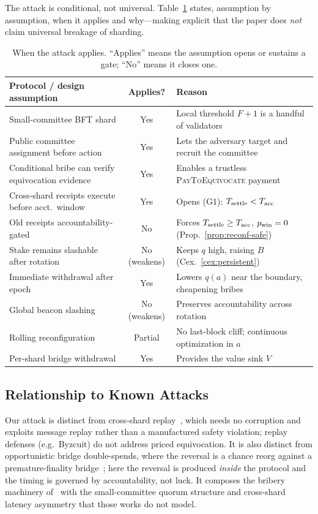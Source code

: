 The attack is conditional, not universal. Table~\ref{tab:applicability} states, assumption by
assumption, when it applies and why---making explicit that the paper does \emph{not} claim universal
breakage of sharding.

\begin{table}[t]
\centering
\caption{When the attack applies. ``Applies'' means the assumption opens or sustains a gate; ``No''
means it closes one.}
\label{tab:applicability}
\small
\begin{tabularx}{\textwidth}{@{}lcX@{}}
\toprule
Protocol / design assumption & Applies? & Reason \\
\midrule
Small-committee BFT shard                          & Yes        & Local threshold $F{+}1$ is a handful of validators \\
Public committee assignment before action          & Yes        & Lets the adversary target and recruit the committee \\
Conditional bribe can verify equivocation evidence & Yes        & Enables a trustless \textsc{PayToEquivocate} payment \\
Cross-shard receipts execute before acct.\ window  & Yes        & Opens (G1): $T_{\mathrm{settle}}<T_{\mathrm{acc}}$ \\
Old receipts accountability-gated                  & No         & Forces $T_{\mathrm{settle}}\ge T_{\mathrm{acc}}$, $p_{\mathrm{win}}=0$ (Prop.~\ref{prop:reconf-safe}) \\
Stake remains slashable after rotation             & No (weakens)& Keeps $q$ high, raising $B$ (Cex.~\ref{cex:persistent}) \\
Immediate withdrawal after epoch                   & Yes        & Lowers $q(a)$ near the boundary, cheapening bribes \\
Global beacon slashing                             & No (weakens)& Preserves accountability across rotation \\
Rolling reconfiguration                            & Partial    & No last-block cliff; continuous optimization in $a$ \\
Per-shard bridge withdrawal                        & Yes        & Provides the value sink $V$ \\
\bottomrule
\end{tabularx}
\end{table}

\subsection{Relationship to Known Attacks}
Our attack is distinct from cross-shard replay~\cite{sonnino2020replay}, which needs no corruption and
exploits message replay rather than a manufactured safety violation; replay defenses (e.g.\ Byzcuit)
do not address priced equivocation. It is also distinct from opportunistic bridge double-spends, where
the reversal is a chance reorg against a premature-finality bridge~\cite{zamyatin2021sok,lee2022sokbridge};
here the reversal is produced \emph{inside} the protocol and the timing is governed by accountability,
not luck. It composes the bribery machinery of~\cite{mccorry2018smart,karakostas2024bribing,sookitoth2025bribers}
with the small-committee quorum structure and cross-shard latency asymmetry that those works do not
model.

